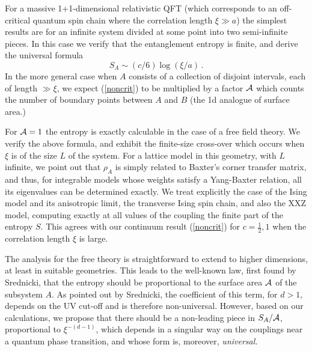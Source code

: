 \documentclass[12pt,aps]{revtex4}
\begin{document}
For a massive 1+1-dimensional relativistic QFT (which corresponds to an
off-critical quantum spin chain where the correlation length $\xi\gg a$)
the simplest results are for an infinite system divided at some point
into two semi-infinite pieces.
In this case we verify that
the entanglement entropy is finite, and derive the universal formula
\begin{equation}
\label{noncrit}
S_A\sim (c/6)\log(\xi/a)\,.
\end{equation}
In the more general case when $A$ consists of a collection of disjoint
intervals, each of length $\gg\xi$, we expect (\ref{noncrit}) to be
multiplied by a factor
$\cal A$ which counts the number of boundary points between $A$ and
$B$ (the 1d analogue of surface area.)

For ${\cal A}=1$ the entropy is exactly
calculable in the case of a free field theory. We verify the above
formula, and exhibit the finite-size
cross-over which occurs when $\xi$ is of the size $L$ of the system.
For a lattice model in this geometry, with $L$ infinite, we point out that
$\rho_A$ is simply related to Baxter's corner transfer matrix, and thus,
for integrable models whose weights satisfy a Yang-Baxter relation, all
its eigenvalues can be determined exactly. We treat explicitly the case
of the Ising model and its anisotropic limit, the transverse Ising spin
chain, and also the XXZ model,
computing exactly at all values of the coupling the finite
part of the entropy $S$. This agrees with our continuum result
(\ref{noncrit}) for $c=\frac12,1 $ when the correlation length $\xi$ is large.

The analysis for the free theory is straightforward to extend
to higher dimensions, at least in suitable geometries. This leads to the
well-known law, first found by Srednicki\cite{s-93}, that the
entropy should be proportional to the surface area $\cal A$ of the
subsystem $A$. As pointed out by Srednicki, the coefficient of this term,
for $d>1$, depends on the UV cut-off and is therefore non-universal.
However, based on our calculations, we propose that there should be a
non-leading piece in $S_A/{\cal A}$, proportional to $\xi^{-(d-1)}$,
which depends
in a singular way on the couplings near a quantum phase transition, and
whose form is, moreover, \em universal\em.
\end{document}
